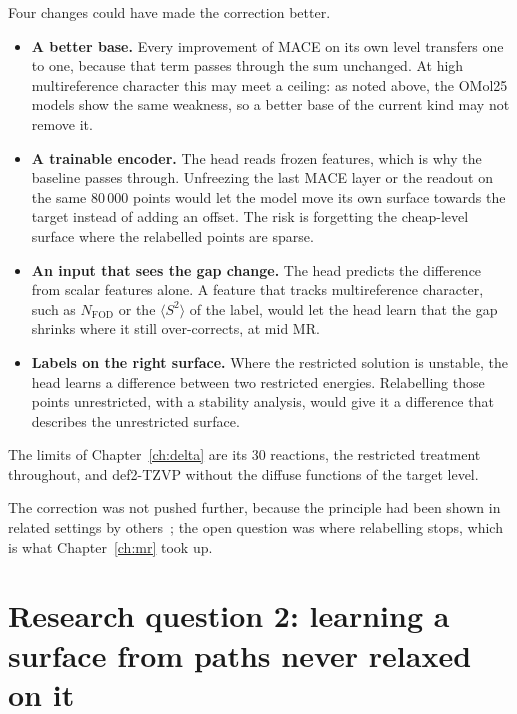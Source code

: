 Four changes could have made the correction better.

\begin{itemize}
  \item \textbf{A better base.} Every improvement of MACE on its own
    level transfers one to one, because that term passes through the
    sum unchanged. At high multireference character this may meet a
    ceiling: as noted above, the OMol25 models show the same weakness,
    so a better base of the current kind may not remove it.
  \item \textbf{A trainable encoder.} The head reads frozen features,
    which is why the baseline passes through. Unfreezing the last MACE
    layer or the readout on the same 80\,000 points would let the model
    move its own surface towards the target instead of adding an
    offset. The risk is forgetting the cheap-level surface where the
    relabelled points are sparse.
  \item \textbf{An input that sees the gap change.} The head predicts
    the difference from scalar features alone. A feature that tracks
    multireference character, such as $N_\text{FOD}$ or the
    $\langle S^2 \rangle$ of the label, would let the head learn that
    the gap shrinks where it still over-corrects, at mid MR.
  \item \textbf{Labels on the right surface.} Where the restricted
    solution is unstable, the head learns a difference between two
    restricted energies. Relabelling those points unrestricted, with a
    stability analysis, would give it a difference that describes the
    unrestricted surface.
\end{itemize}

The limits of Chapter~\ref{ch:delta} are its 30 reactions, the restricted
treatment throughout, and def2-TZVP without the diffuse functions of
the target level.

The correction was not pushed further, because the principle had been
shown in related settings by others~\cite{allen2026, ren2026}; the open question
was where relabelling stops, which is what Chapter~\ref{ch:mr} took up.

\section{Research question 2: learning a surface from paths never relaxed on it}

